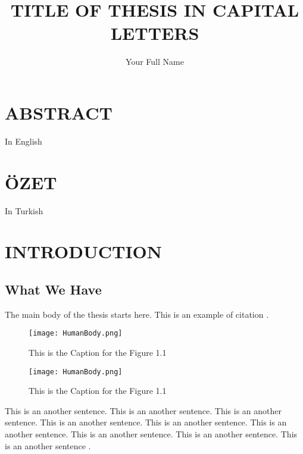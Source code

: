\documentclass[a4paper, 12pt]{report}
\title{TITLE OF THESIS IN CAPITAL LETTERS}
\author{Your Full Name}
\begin{document}
\makecstitle

\tableofcontents
\listoffigures
\listoftables

\begin{symabbreviations}


\sym{}{}

\end{symabbreviations}

\chapter*{ABSTRACT}
In English

\chapter*{ÖZET}
In Turkish

\chapter{INTRODUCTION}

\section{What We Have}
The main body of the thesis starts here.
This is an example of citation \cite{label}.


\begin{figure}[!h]
\begin{center}
\texttt{[image: HumanBody.png]}
\caption{This is the Caption for the Figure 1.1}
\end{center}
\end{figure}


\begin{figure}[!h]
\begin{center}
\texttt{[image: HumanBody.png]}
\caption{This is the Caption for the Figure 1.1}
\end{center}
\end{figure}

This is an another sentence. This is an another sentence. This is an another sentence. This is an another sentence.
This is an another sentence. This is an another sentence. This is an another sentence. This is an another sentence.
This is an another sentence \cite{lee}.
\end{document}
